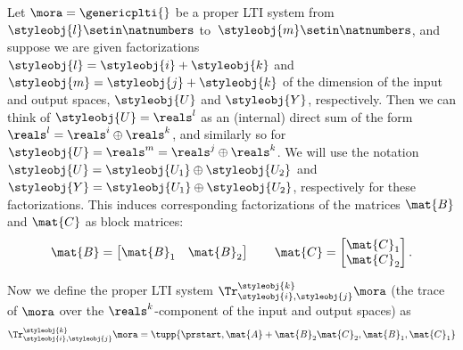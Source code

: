 \begin{definition}\label{def:trace-lti-prop}
    Let $\mora = \genericplti{}$ be a proper LTI system from $\styleobj{l}\setin \natnumbers$ to~$\styleobj{m}\setin \natnumbers$, and suppose we are given factorizations $\styleobj{l} = \styleobj{i} + \styleobj{k}$ and $\styleobj{m} = \styleobj{j} + \styleobj{k}$ of the dimension of the input and output spaces, $\styleobj{U}$ and $\styleobj{Y}$, respectively. Then we can think of $\styleobj{U} = \reals^l$ as an (internal) direct sum of the form $\reals^l = \reals^i \oplus \reals^k$, and similarly so for $\styleobj{U} = \reals^m = \reals^j \oplus \reals^k$. We will use the notation $\styleobj{U} = \styleobj{U_1} \oplus \styleobj{U_2}$ and $\styleobj{Y} = \styleobj{U_1} \oplus \styleobj{U_2}$, respectively for these factorizations. This induces corresponding factorizations of the matrices $\mat{B}$ and $\mat{C}$ as block matrices: 
    \begin{equation}
\mat{B} = 
\begin{bmatrix}
\mat{B}_1 & \mat{B}_2
\end{bmatrix}
\qquad 
\mat{C} = 
\begin{bmatrix}
\mat{C}_1 \\
\mat{C}_2
\end{bmatrix}.
\end{equation}

   
 Now we define the proper LTI system $\Tr_{\styleobj{i},\styleobj{j}}^{\styleobj{k}}\mora$ (the trace of $\mora$ over the $\reals^k$-component of the input and output spaces) as
   \begin{equation}\label{eq:proper-LTI-trace-formula}
        \Tr_{\styleobj{i},\styleobj{j}}^{\styleobj{k}}\mora = \tupp{\prstart,\mat{A} + \mat{B}_2 \mat{C}_2, \mat{B}_1,\mat{C}_1}
    \end{equation}
% 
\end{definition}



